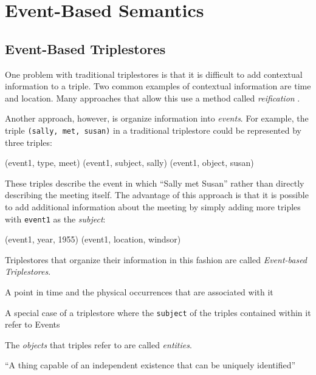 \documentclass[../main.tex]{subfiles}
\begin{document}
\chapter {Event-Based Semantics}

\section{Event-Based Triplestores}

One problem with traditional triplestores is that it is difficult to add contextual information to a triple.  Two common examples of contextual information are time and location.  Many approaches that allow this use a method called {\em reification} \cite{?}.

Another approach, however, is organize information into {\em events}.  For example, the triple \texttt{(sally, met, susan)} in a traditional triplestore could be represented by three triples:

\begin{code}
	(event1, type, meet)
	(event1, subject, sally)
	(event1, object, susan)
\end{code}

These triples describe the event in which ``Sally met Susan'' rather than directly describing the meeting itself.  The advantage of this approach is that it is possible to add additional information about the meeting by simply adding more triples with \texttt{event1} as the {\em subject}:

\begin{code}
	(event1, year, 1955)
	(event1, location, windsor)
\end{code}

Triplestores that organize their information in this fashion are called {\em Event-based Triplestores}.

\begin{definition}[Event]
	A point in time and the physical occurrences that are associated with it
\end{definition}

\begin{definition}
	A special case of a triplestore where the \texttt{subject} of the triples contained within it refer to Events\cite{frostagboola2014}
\end{definition}

The {\em objects} that triples refer to are called {\em entities}.

\begin{definition}[Entity]
	``A thing capable of an independent existence that can be uniquely identified'' \cite{kent2015era}
\end{definition}
\end{document}
